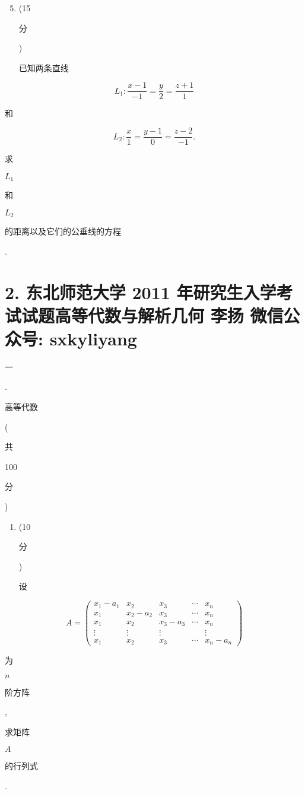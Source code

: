 \documentclass[10pt]{article}
\begin{document}
\begin{enumerate}
  \setcounter{enumi}{4}
  \item (15 \begin{CJK}{UTF8}{mj}分\end{CJK}) \begin{CJK}{UTF8}{mj}已知两条直线\end{CJK}
\end{enumerate}
$$
L_{1}: \frac{x-1}{-1}=\frac{y}{2}=\frac{z+1}{1}
$$
\begin{CJK}{UTF8}{mj}和\end{CJK}
$$
L_{2}: \frac{x}{1}=\frac{y-1}{0}=\frac{z-2}{-1} .
$$
\begin{CJK}{UTF8}{mj}求\end{CJK} $L_{1}$ \begin{CJK}{UTF8}{mj}和\end{CJK} $L_{2}$ \begin{CJK}{UTF8}{mj}的距离以及它们的公垂线的方程\end{CJK}.

\section{2. 东北师范大学 2011 年研究生入学考试试题高等代数与解析几何 
 李扬 
 微信公众号: sxkyliyang}
\begin{CJK}{UTF8}{mj}一\end{CJK}. \begin{CJK}{UTF8}{mj}高等代数\end{CJK} (\begin{CJK}{UTF8}{mj}共\end{CJK} 100 \begin{CJK}{UTF8}{mj}分\end{CJK})

\begin{enumerate}
  \item (10 \begin{CJK}{UTF8}{mj}分\end{CJK}) \begin{CJK}{UTF8}{mj}设\end{CJK}
\end{enumerate}
$$
A=\left(\begin{array}{ccccc}
x_{1}-a_{1} & x_{2} & x_{3} & \cdots & x_{n} \\
x_{1} & x_{2}-a_{2} & x_{3} & \cdots & x_{n} \\
x_{1} & x_{2} & x_{3}-a_{3} & \cdots & x_{n} \\
\vdots & \vdots & \vdots & & \vdots \\
x_{1} & x_{2} & x_{3} & \cdots & x_{n}-a_{n}
\end{array}\right)
$$
\begin{CJK}{UTF8}{mj}为\end{CJK} $n$ \begin{CJK}{UTF8}{mj}阶方阵\end{CJK}, \begin{CJK}{UTF8}{mj}求矩阵\end{CJK} $A$ \begin{CJK}{UTF8}{mj}的行列式\end{CJK}.
\end{document}

